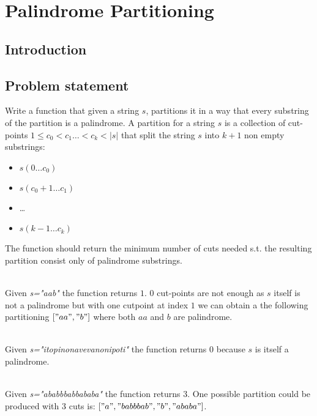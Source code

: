 %

\chapter{Palindrome Partitioning }
\label{ch:palindrome_partitioning2}
\section*{Introduction}

\section{Problem statement}
\begin{exercise}
Write a function that given a string $s$,
partitions it in a way that every substring of the partition is a palindrome.
A partition for a string $s$ is a collection of cut-points $1 \leq c_0 < c_1 \ldots < c_k < |s|$ 
that split the string $s$ into $k+1$ non empty substrings:
\begin{itemize}
	\item $s(0 \ldots c_0)$
	\item $s(c_0+1 \ldots c_1)$
	\item \ldots
	\item $s(k-1 \ldots c_k)$
\end{itemize}
The function should return the minimum number of cuts needed 
s.t. the resulting partition consist only of palindrome substrings.

\begin{example}
		\hfill \\
		Given \textit{s="aab"} the function returns $1$. 
		$0$ cut-points are not enough as $s$ itself is not a palindrome but with one cutpoint at
		index $1$ we can obtain a the following partitioning $["aa","b"]$ where both $aa$ and $b$ are palindrome. 
	\end{example}

	\begin{example}
		\hfill \\
		Given \textit{s="itopinonavevanonipoti"} the function returns $0$ because $s$ is itself a palindrome. 
	\end{example}

	\begin{example}
		\hfill \\
		Given \textit{s="ababbbabbababa"} the function returns $3$. One possible partition could be produced with $3$ cuts is: $["a","babbbab","b","ababa"]$.
	\end{example}
\end{exercise}
